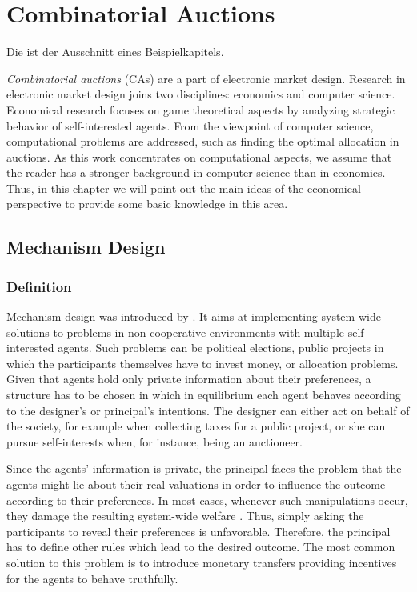 \chapter{Combinatorial Auctions}
 \label{chap:combinatorialAuctions}

Die ist der Ausschnitt eines Beispielkapitels.

\emph{Combinatorial auctions} (CAs) are a part of electronic
market design. Research in electronic market design joins two
disciplines: economics and computer science. Economical research
focuses on game theoretical aspects by analyzing strategic
behavior of self-interested agents. From the viewpoint of computer
science, computational problems are addressed, such as finding the
optimal allocation in auctions. As this work concentrates on
computational aspects, we assume that the reader has a stronger
background in computer science than in economics. Thus, in this
chapter we will point out the main ideas of the economical
perspective to provide some basic knowledge in this area.

\section{Mechanism Design}
\subsection{Definition}
Mechanism design was introduced by \textcite{Hu60}. It
aims at implementing system-wide solutions to problems in
non-cooperative environments with multiple self-interested agents.
Such problems can be political elections, public projects in which
the participants themselves have to invest money, or allocation
problems. Given that agents hold only private information about
their preferences, a structure has to be chosen in which in
equilibrium each agent behaves according to the designer's or principal's
intentions. The designer can either act on behalf of the society, for
example when collecting taxes for a public project, or she can
pursue self-interests when, for instance, being an auctioneer.

Since the agents' information is private, the principal faces the
problem that the agents might lie about their real valuations in
order to influence the outcome according to their preferences. In
most cases, whenever such manipulations occur, they damage the
resulting system-wide welfare \parencite{NiRo00}. Thus, simply asking
the participants to reveal their preferences is unfavorable.
Therefore, the principal has to define other rules which lead to
the desired outcome. The most common solution to this problem is
to introduce monetary transfers providing incentives for the
agents to behave truthfully.


